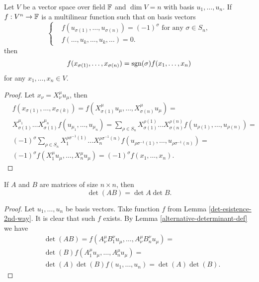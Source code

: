\documentclass[main.tex]{subfiles}
\begin{document}
\begin{lemma}
\label{det-esistence-2nd-way}
Let $V$ be a vector space over field $\mathbb{F}$ and $\dim V = n$ with basis $u_1, \dots, u_n$.
If $f:V^n\to \mathbb{F}$ is a multilinear function such that
on basis vectors
\begin{equation}
\begin{cases}
& f(u_{\sigma(1)},\dots,u_{\sigma(n)}) = (-1)^\sigma \text{ for any } \sigma\in S_n,\\
& f(\dots, u_k,\dots,u_k,\dots) = 0.
\end{cases}
\end{equation}
then
\begin{equation}
f(x_{\sigma(1)},\ldots, x_{\sigma(n)}) = \text{sgn}(\sigma)f(x_1,\ldots, x_n)
\end{equation}
for any $x_1, \dots, x_n\in V$.
\end{lemma}
\begin{proof}
Let $x_\nu = X^\mu_\nu u_\mu$, then
\begin{align*}
& f(x_{\sigma(1)},\ldots, x_{\sigma(k)}) = f(X^\mu_{\sigma(1)}u_\mu, \dots, X^\mu_{\sigma(n)}u_\mu) = \\
& X^{\mu_1}_{\sigma(1)}\dots X^{\mu_n}_{\sigma(1)}f(u_{\mu_1}, \dots, u_{\mu_n})
= \sum_{\rho\in S_n} X^{\rho(1)}_{\sigma(1)}\dots X^{\rho(n)}_{\sigma(n)}
f(u_{\rho(1)}, \dots, u_{\rho(n)}) = \\
& (-1)^\sigma \sum_{\rho\in S_n} X^{\rho\sigma^{-1}(1)}_{1}\dots X^{\rho\sigma^{-1}(n)}_{n}
f(u_{\rho\sigma^{-1}(1)}, \dots, u_{\rho\sigma^{-1}(n)}) = \\
& (-1)^\sigma f(X^\mu_{1}u_\mu, \dots, X^\mu_{n}u_\mu) = (-1)^\sigma f(x_1,\ldots, x_n).
\end{align*}
\end{proof} 

\begin{theorem}
If $A$ and $B$ are matrices of size $n\times n$, then
\begin{equation}
\det(AB) = \det A\det B.
\end{equation} 
\end{theorem}
\begin{proof}
Let $u_1, \dots, u_n$ be basis vectors.
Take function $f$ from Lemma \ref{det-esistence-2nd-way}. It is clear that such $f$ exists.
By Lemma \ref{alternative-determinant-def} we have
\begin{align*}
&\det(AB) = f(A^\mu_\nu B^\nu_1 u_\mu, \dots, A^\mu_\nu B^\nu_n u_\mu) = \\
&\det(B) f(A^\mu_1 u_\mu, \dots, A^\mu_n u_\mu) = \\
&\det(A)\det(B) f(u_1, \dots, u_n) = \det(A)\det(B).
\end{align*}
\end{proof}
\end{document}
